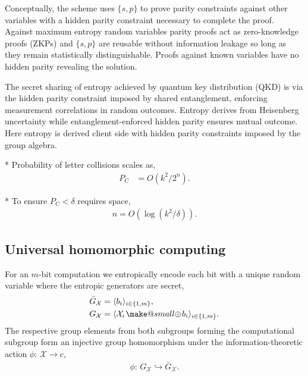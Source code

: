 \documentclass[twocolumn, aps, amsmath, amssymb, nofootinbib, superscriptaddress, longbibliography, doublefloatfix, table-of-contents, eqsecnum, rmp]{revtex4-2}
\makeatletter
\newcommand{\soplus}{{{\hspace{1pt}}{\mathbin{\mathpalette\make@small{\mathbin\oplus}}}}{\hspace{1pt}}}
\newcommand{\make@small}[2]{%
  \vcenter{\hbox{%
    \scalebox{0.6}{$\m@th#1#2$}%
  }}%
}
\makeatother
\begin{document}
Conceptually, the scheme uses $\{s,p\}$ to prove parity constraints against other variables with a hidden parity constraint necessary to complete the proof. Against maximum entropy random variables parity proofs act as zero-knowledge proofs (ZKPs) and $\{s,p\}$ are reusable without information leakage so long as they remain statistically distinguishable. Proofs against known variables have no hidden parity revealing the solution.

The secret sharing of entropy achieved by quantum key distribution (QKD) is via the hidden parity constraint imposed by shared entanglement, enforcing measurement correlations in random outcomes. Entropy derives from Heisenberg uncertainty while entanglement-enforced hidden parity ensures mutual outcome. Here entropy is derived client side with hidden parity constraints imposed by the group algebra.

* Probability of letter collisions scales as,
\begin{align}
	P_\mathrm{C} &= O(k^2/2^n).
\end{align}

* To ensure $P_\mathrm{C}< \delta$ requires space,
\begin{align}
	n = O(\log(k^2/\delta)).
\end{align}

\subsection{Universal homomorphic computing}

For an $m$-bit computation we entropically encode each bit with a unique random variable where the entropic generators are secret,
\begin{align}
	\bar{G}_\mathcal{X} &= \langle b_i \rangle_{i\in\{1,m\}},\nonumber\\
	G_\mathcal{X} &= \langle \mathcal{X}_i \soplus b_i \rangle_{i\in\{1,m\}}.
\end{align}
The respective group elements from both subgroups forming the computational subgroup form an injective group homomorphism under the information-theoretic action $\phi:\, \mathcal{X}\to c$,
\begin{align}
	\phi:\, G_\mathcal{X}  \hookrightarrow \bar{G}_\mathcal{X}.
\end{align}
\end{document}
